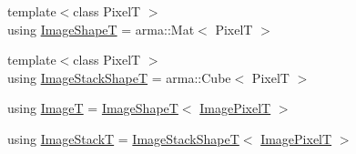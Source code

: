 \begin{DoxyCompactItemize}
{\footnotesize template$<$class PixelT $>$ }\\using \hyperlink{classmappel_1_1ImageFormat2DBase_ac40fc3773b5668601c63905876cca732}{Image\+ShapeT} = arma\+::\+Mat$<$ PixelT $>$
\item 
{\footnotesize template$<$class PixelT $>$ }\\using \hyperlink{classmappel_1_1ImageFormat2DBase_ae2e123c8a5a5ab00f89eaea04d2431cb}{Image\+Stack\+ShapeT} = arma\+::\+Cube$<$ PixelT $>$
\item 
using \hyperlink{classmappel_1_1ImageFormat2DBase_a667ea5016648958e507e7db8eaa041b0}{ImageT} = \hyperlink{classmappel_1_1ImageFormat2DBase_ac40fc3773b5668601c63905876cca732}{Image\+ShapeT}$<$ \hyperlink{classmappel_1_1ImageFormat2DBase_af6bae6f78398ab1eacb39726a05adeef}{Image\+PixelT} $>$
\item 
using \hyperlink{classmappel_1_1ImageFormat2DBase_a8f0276e94ff242fa4740a718642f5e14}{Image\+StackT} = \hyperlink{classmappel_1_1ImageFormat2DBase_ae2e123c8a5a5ab00f89eaea04d2431cb}{Image\+Stack\+ShapeT}$<$ \hyperlink{classmappel_1_1ImageFormat2DBase_af6bae6f78398ab1eacb39726a05adeef}{Image\+PixelT} $>$
\end{DoxyCompactItemize}
